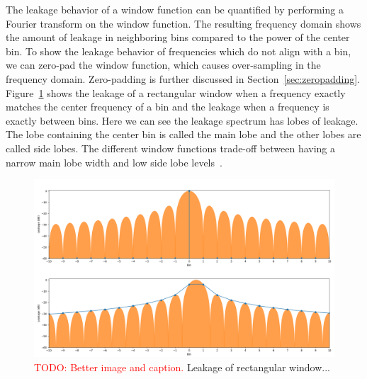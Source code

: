 \documentclass[10pt,twocolumn]{article}
\begin{document}
The leakage behavior of a window function can be quantified by performing a Fourier transform on the window function. The resulting frequency domain shows the amount of leakage in neighboring bins compared to the power of the center bin. To show the leakage behavior of frequencies which do not align with a bin, we can zero-pad the window function, which causes over-sampling in the frequency domain. Zero-padding is further discussed in Section~\ref{sec:zeropadding}. Figure~\ref{fig:winleak} shows the leakage of a rectangular window when a frequency exactly matches the center frequency of a bin and the leakage when a frequency is exactly between bins. Here we can see the leakage spectrum has lobes of leakage. The lobe containing the center bin is called the main lobe and the other lobes are called side lobes. The different window functions trade-off between having a narrow main lobe width and low side lobe levels~\cite{windowfunc}.
\begin{figure}[h]
    \centering
    \includegraphics[width=\linewidth]{fig/winleak.png}
    \caption{\textcolor{red}{TODO: Better image and caption.} Leakage of rectangular window...}
    \label{fig:winleak}
\end{figure}
\end{document}
